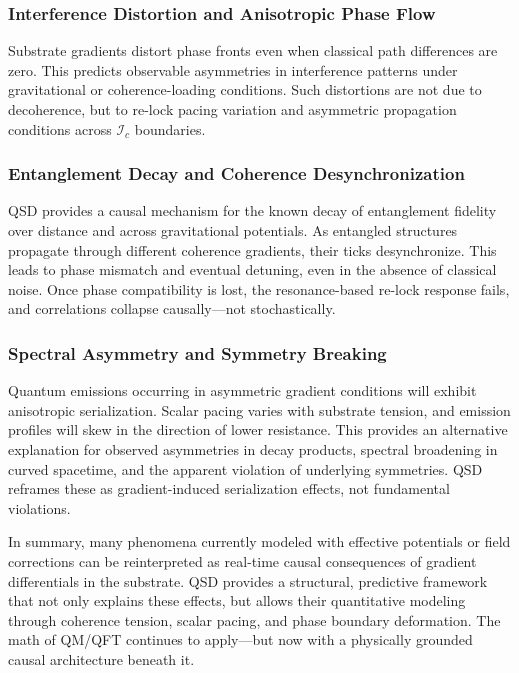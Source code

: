 \documentclass[preprints,article,submit,pdftex,moreauthors]{Definitions/mdpi}
\begin{document}
\subsubsection{Interference Distortion and Anisotropic Phase Flow}

Substrate gradients distort phase fronts even when classical path differences are zero. This predicts observable asymmetries in interference patterns under gravitational or coherence-loading conditions. Such distortions are not due to decoherence, but to re-lock pacing variation and asymmetric propagation conditions across \( \mathcal{I}_c \) boundaries.

\subsubsection{Entanglement Decay and Coherence Desynchronization}

QSD provides a causal mechanism for the known decay of entanglement fidelity over distance and across gravitational potentials. As entangled structures propagate through different coherence gradients, their ticks desynchronize. This leads to phase mismatch and eventual detuning, even in the absence of classical noise. Once phase compatibility is lost, the resonance-based re-lock response fails, and correlations collapse causally—not stochastically.

\subsubsection{Spectral Asymmetry and Symmetry Breaking}

Quantum emissions occurring in asymmetric gradient conditions will exhibit anisotropic serialization. Scalar pacing varies with substrate tension, and emission profiles will skew in the direction of lower resistance. This provides an alternative explanation for observed asymmetries in decay products, spectral broadening in curved spacetime, and the apparent violation of underlying symmetries. QSD reframes these as gradient-induced serialization effects, not fundamental violations.

\smallskip

In summary, many phenomena currently modeled with effective potentials or field corrections can be reinterpreted as real-time causal consequences of gradient differentials in the substrate. QSD provides a structural, predictive framework that not only explains these effects, but allows their quantitative modeling through coherence tension, scalar pacing, and phase boundary deformation. The math of QM/QFT continues to apply—but now with a physically grounded causal architecture beneath it.
\end{document}
